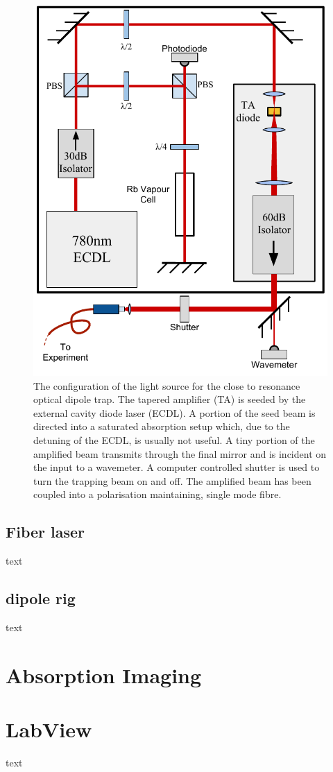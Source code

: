 \begin{figure}
\centering
\includegraphics{figs/TAsetup.pdf}
\caption{The configuration of the light source for the close to resonance optical dipole trap. The tapered amplifier (TA) is seeded by the external cavity diode laser (ECDL). A portion of the seed beam is directed into a saturated absorption setup which, due to the detuning of the ECDL, is usually not useful. A tiny portion of the amplified beam transmits through the final mirror and is incident on the input to a wavemeter. A computer controlled shutter is used to turn the trapping beam on and off. The amplified beam has been coupled into a polarisation maintaining, single mode fibre.}
\end{figure}

    \subsection{Fiber laser}
text
    \subsection{dipole rig}
text
\section{Absorption Imaging}



\section{LabView}
text
